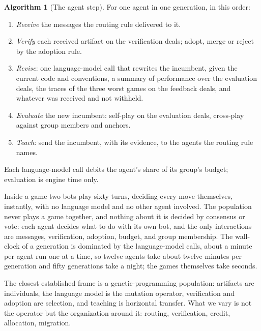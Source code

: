 \documentclass[11pt]{article}
\numberwithin{theorem}{section}
\theoremstyle{definition}
\newtheorem{algorithm}[theorem]{Algorithm}
\theoremstyle{problemstyle}
\begin{document}
\begin{algorithm}[The agent step]\label{alg:step}
For one agent in one generation, in this order:
\begin{enumerate}
\item \emph{Receive} the messages the routing rule delivered to it.
\item \emph{Verify} each received artifact on the verification deals; adopt, merge or reject by the adoption rule.
\item \emph{Revise}: one language-model call that rewrites the incumbent, given the current code and conventions, a
summary of performance over the evaluation deals, the traces of the three worst games on the feedback deals, and
whatever was received and not withheld.
\item \emph{Evaluate} the new incumbent: self-play on the evaluation deals, cross-play against group members and
anchors.
\item \emph{Teach}: send the incumbent, with its evidence, to the agents the routing rule names.
\end{enumerate}
Each language-model call debits the agent's share of its group's budget; evaluation is engine time only.
\end{algorithm}

\begin{remark}
Inside a game two bots play sixty turns, deciding every move themselves, instantly, with no language model and no
other agent involved. The population never plays a game together, and nothing about it is decided by consensus or
vote: each agent decides what to do with its own bot, and the only interactions are messages, verification, adoption,
budget, and group membership. The wall-clock of a generation is dominated by the language-model calls, about a minute
per agent run one at a time, so twelve agents take about twelve minutes per generation and fifty generations take a
night; the games themselves take seconds.
\end{remark}

\begin{remark}
The closest established frame is a genetic-programming population: artifacts are individuals, the language model is the
mutation operator, verification and adoption are selection, and teaching is horizontal transfer. What we vary is not
the operator but the organization around it: routing, verification, credit, allocation, migration.
\end{remark}
\end{document}
